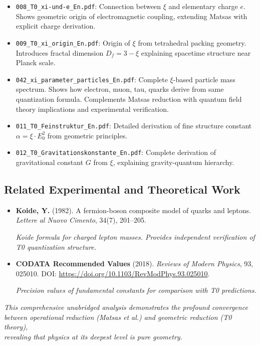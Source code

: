 	\begin{itemize}
		\item \texttt{008\_T0\_xi-und-e\_En.pdf}: Connection between $\xi$ and elementary charge $e$. Shows geometric origin of electromagnetic coupling, extending Matsas with explicit charge derivation.
		
		\item \texttt{009\_T0\_xi\_origin\_En.pdf}: Origin of $\xi$ from tetrahedral packing geometry. Introduces fractal dimension $D_f = 3 - \xi$ explaining spacetime structure near Planck scale.
		
		\item \texttt{042\_xi\_parameter\_particles\_En.pdf}: Complete $\xi$-based particle mass spectrum. Shows how electron, muon, tau, quarks derive from same quantization formula. Complements Matsas reduction with quantum field theory implications and experimental verification.
		
		\item \texttt{011\_T0\_Feinstruktur\_En.pdf}: Detailed derivation of fine structure constant $\alpha = \xi \cdot E_0^2$ from geometric principles.
		
		\item \texttt{012\_T0\_Gravitationskonstante\_En.pdf}: Complete derivation of gravitational constant $G$ from $\xi$, explaining gravity-quantum hierarchy.
	\end{itemize}
	
	\subsection{Related Experimental and Theoretical Work}
	
	\begin{itemize}
		\item \textbf{Koide, Y.} (1982). A fermion-boson composite model of quarks and leptons. \textit{Lettere al Nuovo Cimento}, 34(7), 201--205. 
		
		\textit{Koide formula for charged lepton masses. Provides independent verification of T0 quantization structure.}
		
		\item \textbf{CODATA Recommended Values} (2018). \textit{Reviews of Modern Physics}, 93, 025010. DOI: \url{https://doi.org/10.1103/RevModPhys.93.025010}. 
		
		\textit{Precision values of fundamental constants for comparison with T0 predictions.}
	\end{itemize}
	
	\vspace{1cm}
	
	\begin{center}
		\textit{This comprehensive unabridged analysis demonstrates the profound convergence\\
		between operational reduction (Matsas et al.) and geometric reduction (T0 theory),\\
		revealing that physics at its deepest level is pure geometry.}
	\end{center}
	